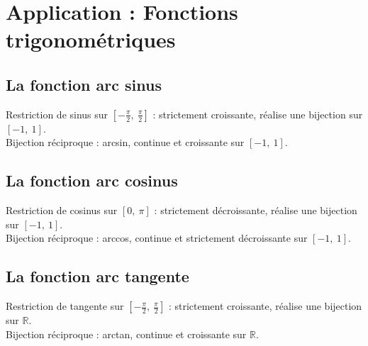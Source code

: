 \section{Application : Fonctions trigonométriques}\label{sec:application---fonctions-trigonometriques}

    \subsection{La fonction arc sinus}\label{subsec:la-fonction-arc-sinus}

        Restriction de sinus sur $[-\frac{\pi}{2},\ \frac{\pi}{2}]$ : strictement croissante, réalise une bijection sur $[-1,\ 1]$.\\
        Bijection réciproque : arcsin, continue et croissante sur $[-1,\ 1]$.

    \subsection{La fonction arc cosinus}\label{subsec:la-fonction-arc-cosunus}

        Restriction de cosinus sur $[0,\ \pi]$ : strictement décroissante, réalise une bijection sur $[-1,\ 1]$.\\
        Bijection réciproque : arccos, continue et strictement décroissante sur $[-1,\ 1]$.

    \subsection{La fonction arc tangente}\label{subsec:la-fonction-arc-tangente}

        Restriction de tangente sur $[-\frac{\pi}{2},\ \frac{\pi}{2}]$ : strictement croissante, réalise une bijection sur $\mathbb{R}$.\\
        Bijection réciproque : arctan, continue et croissante sur $\mathbb{R}$.

